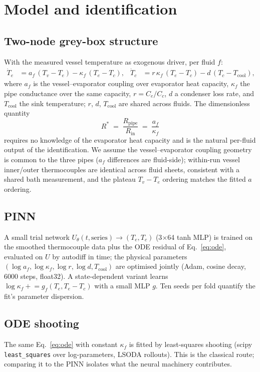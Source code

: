 \section{Model and identification}
\subsection{Two-node grey-box structure}
With the measured vessel temperature as exogenous driver, per fluid $f$:
\begin{align}
\dot T_e &= a_f\,(T_v - T_e) - \kappa_f\,(T_e - T_c), &
\dot T_c &= r\,\kappa_f\,(T_e - T_c) - d\,(T_c - T_{\mathrm{cool}}),
\label{eq:ode}
\end{align}
where $a_f$ is the vessel--evaporator coupling over evaporator heat capacity, $\kappa_f$ the pipe conductance over
the same capacity, $r=C_e/C_c$, $d$ a condenser loss rate, and $T_{\mathrm{cool}}$ the sink temperature; $r$, $d$,
$T_{\mathrm{cool}}$ are shared across fluids. The dimensionless quantity
\begin{equation}
R^* \;=\; \frac{R_{\mathrm{pipe}}}{R_{\mathrm{in}}} \;=\; \frac{a_f}{\kappa_f}
\label{eq:rstar}
\end{equation}
requires no knowledge of the evaporator heat capacity and is the natural per-fluid output of the identification.
We assume the vessel--evaporator coupling geometry is common to the three pipes ($a_f$ differences are fluid-side);
within-run vessel inner/outer thermocouples are identical across fluid sheets, consistent with a shared bath
measurement, and the plateau $T_v{-}T_e$ ordering matches the fitted $a$ ordering.

\subsection{PINN}
A small trial network $U_\theta(t, \text{series})\to(T_e,T_c)$ (3$\times$64 tanh MLP) is trained on the smoothed
thermocouple data plus the ODE residual of Eq.~\eqref{eq:ode}, evaluated on $U$ by autodiff in time; the physical
parameters $(\log a_f, \log\kappa_f, \log r, \log d, T_{\mathrm{cool}})$ are optimised jointly (Adam, cosine decay,
6000 steps, float32). A state-dependent variant learns $\log\kappa_f \mathrel{+}= g_f(T_e, T_e{-}T_c)$ with a small
MLP $g$. Ten seeds per fold quantify the fit's parameter dispersion.

\subsection{ODE shooting}
The same Eq.~\eqref{eq:ode} with constant $\kappa_f$ is fitted by least-squares shooting (scipy
\texttt{least\_squares} over log-parameters, LSODA rollouts). This is the classical route; comparing it to the PINN
isolates what the neural machinery contributes.

